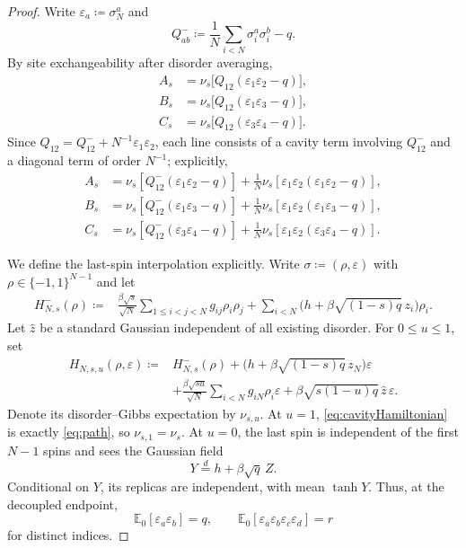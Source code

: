 \documentclass[11pt]{article}
\numberwithin{equation}{section}
\newcommand{\E}{\mathbb{E}}
\newcommand{\1}{\mathbf 1}
\begin{document}
\begin{proof}
Write $\varepsilon_a\coloneqq\sigma_N^a$ and
\[
 Q^-_{ab}\coloneqq\frac1N\sum_{i<N}\sigma_i^a\sigma_i^b-q.
\]
By site exchangeability after disorder averaging,
\begin{align}
 A_s
 &=\nu_s\bigl[Q_{12}(\varepsilon_1\varepsilon_2-q)\bigr],\nonumber\\
 B_s
 &=\nu_s\bigl[Q_{12}(\varepsilon_1\varepsilon_3-q)\bigr],\nonumber\\
 C_s
 &=\nu_s\bigl[Q_{12}(\varepsilon_3\varepsilon_4-q)\bigr].
 \label{eq:siteexchange}
\end{align}
Since
$Q_{12}=Q^-_{12}+N^{-1}\varepsilon_1\varepsilon_2$,
each line consists of a cavity term involving $Q^-_{12}$ and a
diagonal term of order $N^{-1}$; explicitly,
\begin{align}
 A_s&=\nu_s[Q^-_{12}(\varepsilon_1\varepsilon_2-q)]
 +\frac1N\nu_s[\varepsilon_1\varepsilon_2
                    (\varepsilon_1\varepsilon_2-q)],\nonumber\\
 B_s&=\nu_s[Q^-_{12}(\varepsilon_1\varepsilon_3-q)]
 +\frac1N\nu_s[\varepsilon_1\varepsilon_2
                    (\varepsilon_1\varepsilon_3-q)],\nonumber\\
 C_s&=\nu_s[Q^-_{12}(\varepsilon_3\varepsilon_4-q)]
 +\frac1N\nu_s[\varepsilon_1\varepsilon_2
                    (\varepsilon_3\varepsilon_4-q)].
 \label{eq:cavitydecomposition}
\end{align}

We define the last-spin interpolation explicitly.  Write
$\sigma\coloneqq(\rho,\varepsilon)$ with
$\rho\in\{-1,1\}^{N-1}$ and let
\begin{align*}
 H^-_{N,s}(\rho)
 \coloneqq{}&\frac{\beta\sqrt s}{\sqrt N}
 \sum_{1\le i<j<N}g_{ij}\rho_i\rho_j
 +\sum_{i<N}\bigl(h+\beta\sqrt{(1-s)q}\,z_i\bigr)\rho_i.
\end{align*}
Let $\widehat z$ be a standard Gaussian independent of all existing
disorder.  For $0\le u\le1$, set
\begin{align}
 H_{N,s,u}(\rho,\varepsilon)
 \coloneqq{}&H^-_{N,s}(\rho)
 +\bigl(h+\beta\sqrt{(1-s)q}\,z_N\bigr)\varepsilon\nonumber\\
 &+\frac{\beta\sqrt{su}}{\sqrt N}
   \sum_{i<N}g_{iN}\rho_i\varepsilon
 +\beta\sqrt{s(1-u)q}\,\widehat z\,\varepsilon .
 \label{eq:cavityHamiltonian}
\end{align}
Denote its disorder--Gibbs expectation by $\nu_{s,u}$.  At $u=1$,
\eqref{eq:cavityHamiltonian} is exactly \eqref{eq:path}, so
$\nu_{s,1}=\nu_s$.  At $u=0$, the last spin is independent of the
first $N-1$ spins and sees the Gaussian field
\[
 Y\stackrel d=h+\beta\sqrt q\,Z.
\]
Conditional on $Y$, its replicas are independent, with mean
$\tanh Y$.  Thus, at the decoupled endpoint,
\begin{equation}
 \E_0[\varepsilon_a\varepsilon_b]=q,\qquad
 \E_0[\varepsilon_a\varepsilon_b\varepsilon_c\varepsilon_d]=r
 \label{eq:epsilonmoments}
\end{equation}
for distinct indices.


\end{proof}
\end{document}

